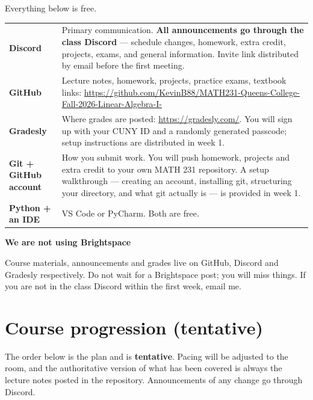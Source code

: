 \documentclass[11pt]{article}
\newenvironment{alertbox}[1]
  {\par\medskip\needspace{5\baselineskip}%
   \begin{lrbox}{\qcbox}%
   \begin{minipage}{\dimexpr\textwidth-2\fboxsep-4pt}%
   \setlength{\parskip}{0.4em}%
   \textbf{\color{warnrule}#1}\par}
  {\end{minipage}\end{lrbox}%
   \begin{center}\colorbox{warnbg}{\usebox{\qcbox}}\end{center}\medskip}
\begin{document}
Everything below is free.

\renewcommand{\arraystretch}{1.3}
\begin{center}
\begin{longtable}{@{} >{\bfseries}l >{\raggedright\arraybackslash}p{11.4cm} @{}}
\toprule
\endhead
\bottomrule
\endlastfoot
Discord & Primary communication. \textbf{All announcements go through the class
Discord} --- schedule changes, homework, extra credit, projects, exams, and
general information. Invite link distributed by email before the first meeting. \\
GitHub & Lecture notes, homework, projects, practice exams, textbook links: \newline
\url{https://github.com/KevinB88/MATH231-Queens-College-Fall-2026-Linear-Algebra-I-} \\
Gradesly & Where grades are posted: \url{https://gradesly.com/}. You will sign
up with your CUNY ID and a randomly generated passcode; setup instructions are
distributed in week 1. \\
Git + GitHub account & How you submit work. You will push homework, projects and
extra credit to your own MATH 231 repository. A setup walkthrough --- creating an
account, installing git, structuring your directory, and what git actually is ---
is provided in week 1. \\
Python + an IDE & VS Code or PyCharm. Both are free. \\
\end{longtable}
\end{center}

\begin{alertbox}{We are not using Brightspace}
Course materials, announcements and grades live on GitHub, Discord and Gradesly
respectively. Do not wait for a Brightspace post; you will miss things. If you
are not in the class Discord within the first week, email me.
\end{alertbox}

\section{Course progression (tentative)}

The order below is the plan and is \textbf{tentative}. Pacing will be adjusted
to the room, and the authoritative version of what has been covered is always
the lecture notes posted in the repository. Announcements of any change go
through Discord.
\end{document}
